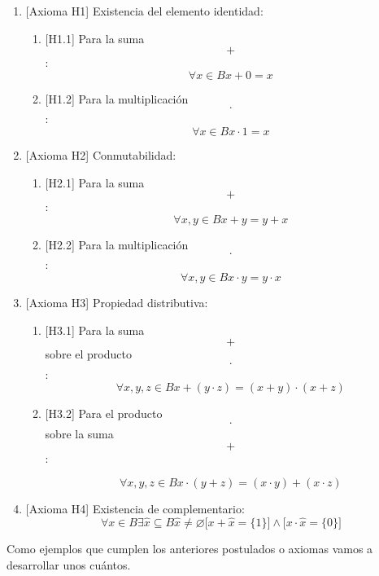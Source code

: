 \begin{enumerate}
\begin{enumerate}
    \begin{enumerate}
    \def\labelenumiii{\arabic{enumiii}.}
    \item
      {[}Axioma H1{]} Existencia del elemento identidad:

      \begin{enumerate}
      \def\labelenumiv{\arabic{enumiv}.}
      \tightlist
      \item
        {[}H1.1{]} Para la suma \[+\]: \[\forall{x \in B}{{x + 0} = x}\]
      \item
        {[}H1.2{]} Para la multiplicación \[\cdot\]:
        \[\forall{x \in B}{{x \cdot 1} = x}\]
      \end{enumerate}
    \item
      {[}Axioma H2{]} Conmutabilidad:

      \begin{enumerate}
      \def\labelenumiv{\arabic{enumiv}.}
      \tightlist
      \item
        {[}H2.1{]} Para la suma \[+\]:
        \[\forall x,{y \in B}{{x + y} = {y + x}}\]
      \item
        {[}H2.2{]} Para la multiplicación\[\cdot\]:
        \[\forall x,{y \in B}{{x \cdot y} = {y \cdot x}}\]
      \end{enumerate}
    \item
      {[}Axioma H3{]} Propiedad distributiva:

      \begin{enumerate}
      \def\labelenumiv{\arabic{enumiv}.}
      \item
        {[}H3.1{]} Para la suma \[+\] sobre el
        producto\[\cdot\]:\[\forall x,y,{z \in B}{{x + {({y \cdot z})}} = {{({x + y})} \cdot {({x + z})}}}\]
      \item
        {[}H3.2{]} Para el producto\[\cdot\]sobre la suma \[+\]:

        \[\forall x,y,{z \in B}{{x \cdot {({y + z})}} = {{({x \cdot y})} + {({x \cdot z})}}}\]
      \end{enumerate}
    \item
      {[}Axioma H4{]} Existencia de complementario:
      \[\forall{x \in B}\exists{\widehat{x} \subseteq B}{\widehat{x} \neq \varnothing}{{\lbrack{{x + \widehat{x}} = {\{ 1\}}}\rbrack} \land {\lbrack{{x \cdot \widehat{x}} = {\{ 0\}}}\rbrack}}\]
    \end{enumerate}
  \end{enumerate}

  Como ejemplos que cumplen los anteriores postulados o axiomas vamos a
  desarrollar unos cuántos.


\end{enumerate}
